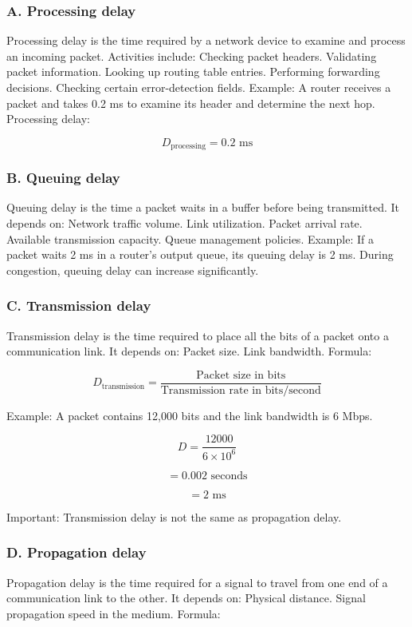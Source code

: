 \subsubsection{A. Processing delay}
Processing delay is the time required by a network device to examine and process an incoming packet.
Activities include:
Checking packet headers.
Validating packet information.
Looking up routing table entries.
Performing forwarding decisions.
Checking certain error-detection fields.
Example: A router receives a packet and takes 0.2 ms to examine its header and determine the next hop.
Processing delay:

\[
D_{\text{processing}}=0.2\text{ ms}
\]

\subsubsection{B. Queuing delay}
Queuing delay is the time a packet waits in a buffer before being transmitted.
It depends on:
Network traffic volume.
Link utilization.
Packet arrival rate.
Available transmission capacity.
Queue management policies.
Example: If a packet waits 2 ms in a router's output queue, its queuing delay is 2 ms.
During congestion, queuing delay can increase significantly.
\subsubsection{C. Transmission delay}
Transmission delay is the time required to place all the bits of a packet onto a communication link.
It depends on:
Packet size.
Link bandwidth.
Formula:

\[
\boxed{D_{\text{transmission}}=\frac{\text{Packet size in bits}}{\text{Transmission rate in bits/second}}}
\]

Example:
A packet contains 12,000 bits and the link bandwidth is 6 Mbps.

\[
D=\frac{12000}{6\times10^6}
\]


\[
=0.002\text{ seconds}
\]


\[
=\boxed{2\text{ ms}}
\]

Important: Transmission delay is not the same as propagation delay.
\subsubsection{D. Propagation delay}
Propagation delay is the time required for a signal to travel from one end of a communication link to the other.
It depends on:
Physical distance.
Signal propagation speed in the medium.
Formula:


